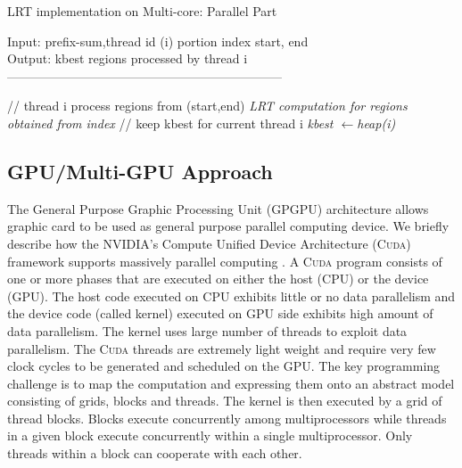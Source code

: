 \documentclass[10pt,journal,cspaper,compsoc]{IEEEtran}
\newcommand{\gpu}{\textsc{GPU}\xspace}
\newcommand{\cpu}{\textsc{CPU}\xspace}
\newcommand{\cuda}{\textsc{Cuda}\xspace}
\begin{document}
\begin{algorithm}[t!]\small
\caption{LRT implementation on Multi-core: Parallel Part}\label{multicorep}
Input: prefix-sum,thread id (i) portion index start, end\\
Output: kbest regions processed by thread i\\
------------------------------------------------------------------ \\
\begin{algorithmic}[1]
 \STATE // thread i process regions from (start,end)
\STATE \textit {LRT computation for regions obtained from index}
\STATE // keep kbest for current thread i
\STATE \textit {kbest \(\leftarrow\)heap(i)}
\ENDFOR
\end{algorithmic}
\end{algorithm}




\subsection{GPU/Multi-GPU Approach}
The General Purpose Graphic Processing Unit (GPGPU) architecture
allows graphic card to be used as general purpose parallel computing
device.  We briefly describe how the NVIDIA's Compute Unified Device Architecture (\cuda) framework supports massively parallel computing \cite{cuda}. A \cuda program consists of one or more phases that are executed on either the host (\cpu) or the device (\gpu). The host code executed on \cpu exhibits little or no data parallelism and the device code (called kernel) executed on \gpu side exhibits high amount of data parallelism. The kernel uses large number of threads to exploit data parallelism. The \cuda threads are
extremely light weight and require very few clock cycles to be generated and scheduled on the \gpu. The key programming challenge is to map the computation and expressing them onto an abstract model consisting of grids, blocks and threads. The kernel is then executed by a grid of thread blocks. Blocks execute concurrently among multiprocessors while threads in a given block execute concurrently within a single multiprocessor. Only threads within a block can cooperate with each other.
\end{document}
